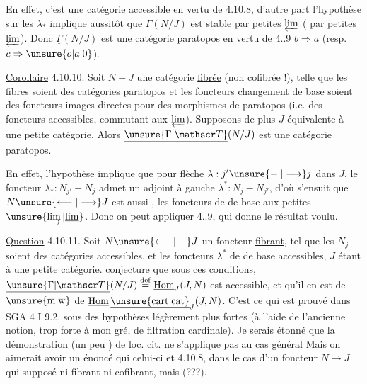 En effet, c'est une catégorie accessible en vertu de 4.10.8, d'autre part l'hypothèse sur les $\lambda_*$ implique aussitôt que  $\underline{\Gamma}(N/J)$ est stable par petites $\varprojlim$ ( par petites $\varprojlim$). Donc $\underline{\Gamma}(N/J)$ est une catégorie paratopos en vertu de 4..9 $b\Longrightarrow a$ (resp. $c\Rightarrow\unsure{o|a|0}$).

\uline{Corollaire} 4.10.10. Soit $N\mathrel{-}J$ une catégorie \uline{fibrée} (non cofibrée !), telle que les fibres soient des catégories paratopos et les foncteurs
changement de base soient des foncteurs images directes pour des morphismes de paratopos (i.e. des foncteurs accessibles, commutant aux  $\varprojlim$). Supposons de plus $J$ équivalente à une petite catégorie. Alors $\underline{\unsure{\Gamma|\mathscr T}}(N/J)$ est une catégorie paratopos.

En effet, l'hypothèse implique que pour  flèche $\lambda:j'\unsure{\mathrel{-}|\longrightarrow}j$ dans $J$, le foncteur $\lambda_*:N_{j'}\mathrel{-}N_j$ admet un adjoint à gauche $\lambda^*:N_j\mathrel{-}N_{j'}$, d'où s'ensuit que $N\unsure{\longleftarrow|\longrightarrow}J$ est aussi , les  foncteurs de  de base  aux petites $\unsure{\varinjlim|\underline{\lim}}$. Donc on peut appliquer 4..9, qui donne le résultat voulu.

\uline{Question} 4.10.11. Soit $N\unsure{\longleftarrow|\mathrel{-}}J$ un foncteur \uline{fibrant}, tel que les $N_j$ soient des catégories accessibles, et les foncteurs $\lambda^*$ de  de base accessibles, $J$ étant  à une petite catégorie. 
conjecture que sous ces conditions, $\underline{\unsure{\Gamma|\mathscr T}}(N/J)\overset{\mathrm{def}}{=}\underline{\mathrm{Hom}}_J(J,N)$ est accessible, et qu'il en est de $\unsure{\overline{\mathrm m}|\overline{\mathrm w}}$ de $\underline{\mathrm{Hom}}\,\underline{\unsure{\mathrm{cart}|\mathrm{cat}}}_J(J,N)$. C'est ce qui est prouvé dans SGA 4 I 9.2. sous des hypothèses légèrement plus fortes (à l'aide de l'ancienne notion, trop forte à mon gré, de filtration cardinale). Je serais étonné que la démonstration (un peu ) de loc. cit. ne s'applique pas au cas général Mais on aimerait avoir un énoncé qui  celui-ci et 4.10.8, dans le cas d'un foncteur $N\longrightarrow J$ qui  supposé ni fibrant ni cofibrant, mais  (???).

